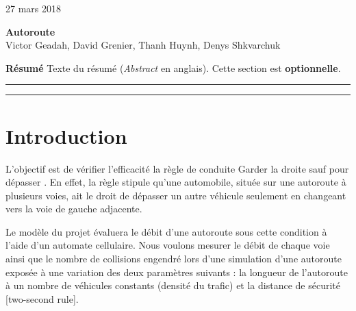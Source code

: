\documentclass[12pt,letterpaper]{article}
\begin{document}
 \hfill {27 mars 2018}
\begin{center}
	\LARGE\textbf{Autoroute}\\[10pt]
	\large{Victor Geadah, David Grenier, Thanh Huynh, Denys Shkvarchuk}\\[10pt]
\end{center}
\hspace{2pt}

\normalsize %

\noindent\textbf{Résumé} Texte du résumé (\textit{Abstract} en anglais). Cette section est \textbf{optionnelle}.

\noindent\hfil\rule{0.9\textwidth}{.4pt} %

\tableofcontents %

\noindent\hfil\rule{0.9\textwidth}{.4pt} %

\section{Introduction}

L'objectif est de vérifier l’efficacité la règle de conduite \guillemotleft\: Garder la droite sauf pour dépasser \guillemotright. En effet, la règle stipule qu'une automobile, située sur une autoroute à plusieurs voies, ait le droit de dépasser un autre véhicule seulement en changeant vers la voie de gauche adjacente. 

\vspace{0.4cm}
Le modèle du projet évaluera le débit d’une autoroute sous cette condition à l'aide d’un automate cellulaire. Nous voulons mesurer le débit de chaque voie ainsi que le nombre de collisions engendré lors d'une simulation d'une autoroute exposée à une variation des deux paramètres suivants : la longueur de l'autoroute à un nombre de véhicules constants (densité du trafic) et la distance de sécurité [two-second rule]. 
\end{document}
